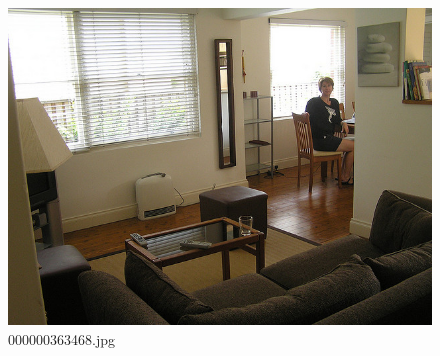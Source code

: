 \begin{figure}[h]
    \centering
    \includegraphics[width=0.8\linewidth]{../image set/hard/000000363468.jpg}
    \caption{000000363468.jpg}
\end{figure}
